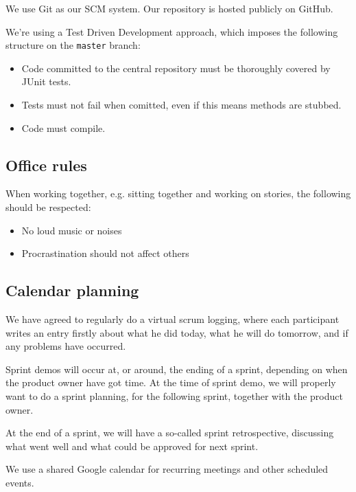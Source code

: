 \documentclass[a4paper,11pt]{article}
\begin{document}
We use Git as our SCM system. 
Our repository is hosted publicly on GitHub.

We're using a Test Driven Development approach, which imposes the following structure on the \texttt{master} branch:
\begin{itemize}
\item Code committed to the central repository must be thoroughly covered by JUnit tests.
\item Tests must not fail when comitted, even if this means methods are stubbed.
\item Code must compile.
\end{itemize}


\subsection{Office rules} %
\label{subsec:office_rules}
When working together, e.g. sitting together and working on stories, the following should be respected:

\begin{itemize}
	\item No loud music or noises

	\item Procrastination should not affect others
\end{itemize}

\subsection{Calendar planning} %
\label{subsec:calendar_planning}

We have agreed to regularly do a virtual scrum logging, where each participant writes an entry firstly about what he did today, what he will do tomorrow, and if any problems have occurred.

Sprint demos will occur at, or around, the ending of a sprint, depending on when the product owner have got time.
At the time of sprint demo, we will properly want to do a sprint planning, for the following sprint, together with the product owner.

At the end of a sprint, we will have a so-called sprint retrospective, discussing what went well and what could be approved for next sprint.

We use a shared Google calendar for recurring meetings and other scheduled events.
\end{document}

